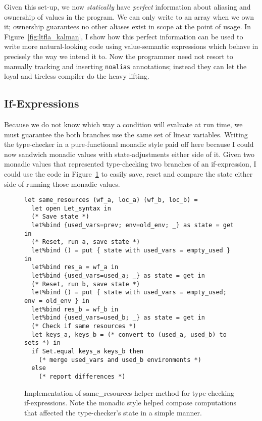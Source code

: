 Given this set-up, we now \emph{statically} have \emph{perfect} information
about aliasing and ownership of values in the program. We can only write to an
array when we own it; ownership guarantees no other aliases exist in scope at
the point of usage. In Figure~\ref{fig:ltfla_kalman}, I show how this perfect
information can be used to write more natural-looking code using value-semantic
expressions which behave in precisely the way we intend it to.  Now the
programmer need not resort to manually tracking and inserting \texttt{noalias}
annotations; instead they can let the loyal and tireless compiler do the heavy
lifting.

\subsection{If-Expressions}

Because we do not know which way a condition will evaluate at run time, we must
guarantee the both branches use the same set of linear variables. Writing the
type-checker in a pure-functional monadic style paid off here because I could
now sandwich monadic values with state-adjustments either side of it. Given two
monadic values that represented type-checking two branches of an if-expression,
I could use the code in Figure~\ref{fig:same_resources} to easily save, reset
and compare the state either side of running those monadic values.

\begin{figure}[tp]
    \begin{verbatim}
let same_resources (wf_a, loc_a) (wf_b, loc_b) =
  let open Let_syntax in
  (* Save state *)
  let%bind {used_vars=prev; env=old_env; _} as state = get in
  (* Reset, run a, save state *)
  let%bind () = put { state with used_vars = empty_used } in
  let%bind res_a = wf_a in
  let%bind {used_vars=used_a; _} as state = get in
  (* Reset, run b, save state *)
  let%bind () = put { state with used_vars = empty_used; env = old_env } in
  let%bind res_b = wf_b in
  let%bind {used_vars=used_b; _} as state = get in
  (* Check if same resources *)
  let keys_a, keys_b = (* convert to (used_a, used_b) to sets *) in
  if Set.equal keys_a keys_b then
    (* merge used_vars and used_b environments *)
  else
    (* report differences *)
    \end{verbatim}

    \caption{Implementation of same\_resources helper method for type-checking
        if-expressions. Note the monadic style helped compose computations that
        affected the type-checker's state in a simple manner.}\label{fig:same_resources}

\end{figure}


